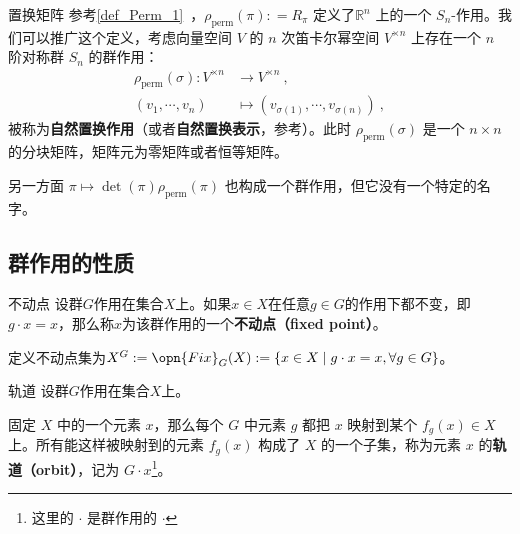 \begin{example}{置换矩阵}\label{ex_Group3_6}
参考\autoref{def_Perm_1}~，$\rho_\text{perm}(\pi): = R_\pi$ 定义了$\mathbb{R}^n$ 上的一个 $S_n$-作用。我们可以推广这个定义，考虑向量空间 $V$ 的 $n$ 次笛卡尔幂空间 $V^{\times n}$ 上存在一个 $n$ 阶对称群 $S_n$ 的群作用：
\begin{equation}
\begin{aligned}
\rho_\text{perm}(\sigma): V^{\times n} &\to V^{\times n}~, \\
(v_1, \cdots, v_n) &\mapsto (v_{\sigma(1)}, \cdots, v_{\sigma(n)})~,
\end{aligned}
\end{equation}
被称为\textbf{自然置换作用}（或者\textbf{自然置换表示}，参考）。此时 $\rho_\text{perm}(\sigma)$ 是一个 $n \times n$ 的分块矩阵，矩阵元为零矩阵或者恒等矩阵。

另一方面 $\pi \mapsto\det(\pi) \rho_\text{perm}(\pi)$ 也构成一个群作用，但它没有一个特定的名字。
\end{example}


\subsection{群作用的性质}


\begin{definition}{不动点}\label{def_Group3_2}
设群$G$作用在集合$X$上。如果$x\in X$在任意$g\in G$的作用下都不变，即$g\cdot x=x$，那么称$x$为该群作用的一个\textbf{不动点（fixed point）}。

定义不动点集为$X^G: = \opn{Fix}_G(X): = \{x\in X\mid g\cdot x=x, \forall g\in G\}$。
\end{definition}




\begin{definition}{轨道}
设群$G$作用在集合$X$上。

固定 $X$ 中的一个元素 $x$，那么每个 $G$ 中元素 $g$ 都把 $x$ 映射到某个 $f_g(x)\in X$ 上。所有能这样被映射到的元素 $f_g(x)$ 构成了 $X$ 的一个子集，称为元素 $x$ 的\textbf{轨道（orbit）}，记为 $G \cdot x$\footnote{这里的 $\cdot$ 是群作用的 $\cdot$ }。
\end{definition}









